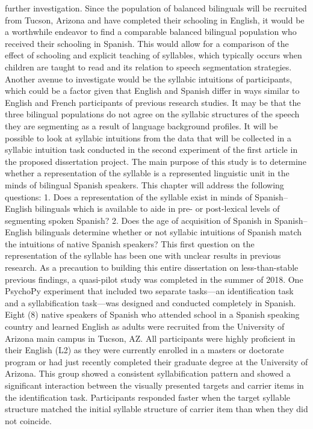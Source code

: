 further investigation. Since the population of balanced bilinguals will be recruited from Tucson, Arizona and have completed their schooling in English, it would be a worthwhile endeavor to find a comparable balanced bilingual population who received their schooling in Spanish. This would allow for a comparison of the effect of schooling and explicit teaching of syllables, which typically occurs when children are taught to read and its relation to speech segmentation strategies. 
Another avenue to investigate would be the syllabic intuitions of participants, which could be a factor given that English and Spanish differ in ways similar to English and French participants of previous research studies. It may be that the three bilingual populations do not agree on the syllabic structures of the speech they are segmenting as a result of language background profiles. It will be possible to look at syllabic intuitions from the data that will be collected in a syllabic intuition task conducted in the second experiment of the first article in the proposed dissertation project. 
The main purpose of this study is to determine whether a representation of the syllable is a represented linguistic unit in the minds of bilingual Spanish speakers. This chapter will address the following questions:
1.	Does a representation of the syllable exist in minds of Spanish–English bilinguals which is available to aide in pre- or post-lexical levels of segmenting spoken Spanish?
2.	Does the age of acquisition of Spanish in Spanish–English bilinguals determine whether or not syllabic intuitions of Spanish match the intuitions of native Spanish speakers?
This first question on the representation of the syllable has been one with unclear results in previous research. As a precaution to building this entire dissertation on less-than-stable previous findings, a quasi-pilot study was completed in the summer of 2018. One PsychoPy experiment that included two separate tasks—an identification task and a syllabification task—was designed and conducted completely in Spanish. Eight (8) native speakers of Spanish who attended school in a Spanish speaking country and learned English as adults were recruited from the University of Arizona main campus in Tucson, AZ. All participants were highly proficient in their English (L2) as they were currently enrolled in a masters or doctorate program or had just recently completed their graduate degree at the University of Arizona. This group showed a consistent syllabification pattern and showed a significant interaction between the visually presented targets and carrier items in the identification task. Participants responded faster when the target syllable structure matched the initial syllable structure of carrier item than when they did not coincide.
